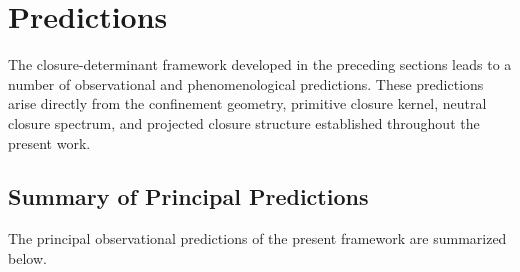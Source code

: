 \documentclass[11pt]{article}
\theoremstyle{definition}
\theoremstyle{remark}
\begin{document}

\section{Predictions}
\label{sec:predictions}

The closure-determinant framework developed in the preceding
sections leads to a number of observational and phenomenological
predictions. These predictions arise directly from the
confinement geometry, primitive closure kernel, neutral closure
spectrum, and projected closure structure established
throughout the present work.

\subsection{Summary of Principal Predictions}
\label{subsec:summary_predictions}

The principal observational predictions of the present
framework are summarized below.
\end{document}
